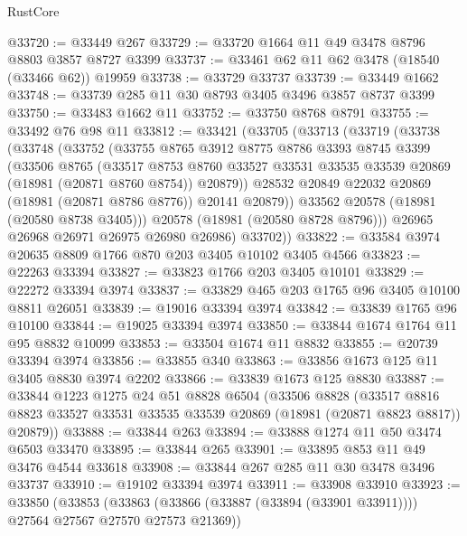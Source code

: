 \begin{lexlean}{RustCore}
\begin{coremodule}
@33720 := @33449 @267
@33729 := @33720 @1664 @11 @49 @3478 @8796 @8803 @3857 @8727 @3399
@33737 := @33461 @62 @11 @62 @3478 (@18540 (@33466 @62)) @19959
@33738 := @33729 @33737
@33739 := @33449 @1662
@33748 := @33739 @285 @11 @30 @8793 @3405 @3496 @3857 @8737 @3399
@33750 := @33483 @1662 @11
@33752 := @33750 @8768 @8791
@33755 := @33492 @76 @98 @11
@33812 := @33421
    (@33705
      (@33713
        (@33719
          (@33738
            (@33748
              (@33752
                (@33755
                  @8765
                  @3912
                  @8775
                  @8786
                  @3393
                  @8745
                  @3399
                  (@33506
                    @8765
                    (@33517
                      @8753
                      @8760
                      @33527
                      @33531
                      @33535
                      @33539
                      @20869
                      (@18981 (@20871 @8760 @8754))
                      @20879))
                  @28532
                  @20849
                  @22032
                  @20869
                  (@18981 (@20871 @8786 @8776))
                  @20141
                  @20879))
              @33562
              @20578
              (@18981 (@20580 @8738 @3405)))
            @20578
            (@18981 (@20580 @8728 @8796)))
          @26965
          @26968
          @26971
          @26975
          @26980
          @26986)
        @33702))
@33822 := @33584 @3974 @20635 @8809 @1766 @870 @203 @3405 @10102 @3405 @4566
@33823 := @22263 @33394
@33827 := @33823 @1766 @203 @3405 @10101
@33829 := @22272 @33394 @3974
@33837 := @33829 @465 @203 @1765 @96 @3405 @10100 @8811 @26051
@33839 := @19016 @33394 @3974
@33842 := @33839 @1765 @96 @10100
@33844 := @19025 @33394 @3974
@33850 := @33844 @1674 @1764 @11 @95 @8832 @10099
@33853 := @33504 @1674 @11 @8832
@33855 := @20739 @33394 @3974
@33856 := @33855 @340
@33863 := @33856 @1673 @125 @11 @3405 @8830 @3974 @2202
@33866 := @33839 @1673 @125 @8830
@33887 := @33844
    @1223
    @1275
    @24
    @51
    @8828
    @6504
    (@33506
      @8828
      (@33517 @8816 @8823 @33527 @33531 @33535 @33539 @20869 (@18981 (@20871 @8823 @8817)) @20879))
@33888 := @33844 @263
@33894 := @33888 @1274 @11 @50 @3474 @6503 @33470
@33895 := @33844 @265
@33901 := @33895 @853 @11 @49 @3476 @4544 @33618
@33908 := @33844 @267 @285 @11 @30 @3478 @3496 @33737
@33910 := @19102 @33394 @3974
@33911 := @33908 @33910
@33923 := @33850
    (@33853 (@33863 (@33866 (@33887 (@33894 (@33901 @33911)))) @27564 @27567 @27570 @27573 @21369))

\end{coremodule}
\end{lexlean}

